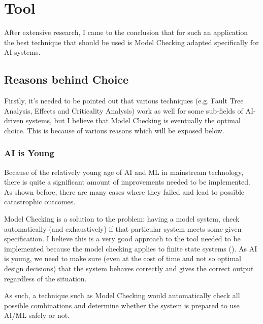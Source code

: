 \documentclass[paper=a4, fontsize=11pt]{scrartcl} %
\numberwithin{equation}{section} %
\numberwithin{figure}{section} %
\numberwithin{table}{section} %
\begin{document}
\section{Tool}

\par
After extensive research, I came to the conclusion that for such an application the best technique that should be used is Model Checking adapted specifically for AI systems. \\


\subsection{Reasons behind Choice}

\par
Firstly, it's needed to be pointed out that various techniques (e.g. Fault Tree Analysis, Effects and Criticality Analysis) work as well for some sub-fields of AI-driven systems, but I believe that Model Checking is eventually the optimal choice. This is because of various reasons which will be exposed below.


\subsubsection{AI is Young}

\par
Because of the relatively young age of AI and ML in mainstream technology, there is quite a significant amount of improvements needed to be implemented. As shown before, there are many cases where they failed and lead to possible catastrophic outcomes. \\

\par
Model Checking is a solution to the problem: having a model system, check automatically (and exhaustively) if that particular system meets some given specification. I believe this is a very good approach to the tool needed to be implemented because the model checking applies to finite state systems (\citet{wiley-encyclopedia}). As AI is young, we need to make sure (even at the cost of time and not so optimal design decisions) that the system behaves correctly and gives the correct output regardless of the situation.

\par
As such, a technique such as Model Checking would automatically check all possible combinations and determine whether the system is prepared to use AI/ML safely or not.
\end{document}
